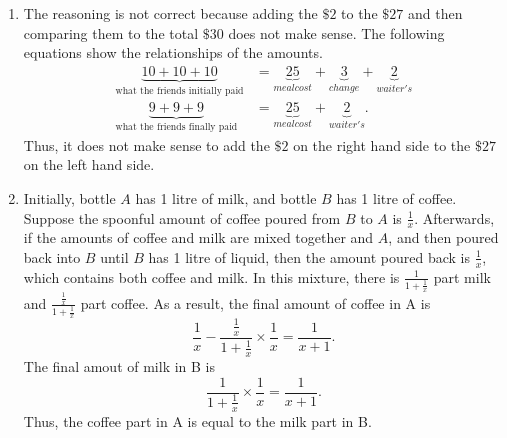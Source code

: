 \documentclass{article}
\begin{document}
\begin{enumerate}[label=(\roman*)]
\begin{enumerate}[label=(\alph*)]
\begin{proof}
\begin{align*}
                            \sqrt{100001} - \sqrt{100000} & < \frac{100001 - 100000}{2\times\sqrt{100000}}                                                      \\
                            \sqrt{100001} - \sqrt{100000} & < \frac{1}{2\times\sqrt{100000}}.
                        \end{align*}
                    \end{proof}
          \end{enumerate}
    \item The reasoning is not correct because adding the $\$2$ to the $\$27$ and then comparing
              them to the total $\$30$ does not make sense. The following equations show the
              relationships of the amounts.
              \begin{align*}
                  \underbrace{10 + 10 + 10}_{\text{what the friends initially paid}} & =
                  \underbrace{25}_{meal cost} + \underbrace{3}_{change} + \underbrace{2}_{waiter's} \\
                  \underbrace{9 + 9 + 9}_{\text{what the friends finally paid}}      & =
                  \underbrace{25}_{meal cost} + \underbrace{2}_{waiter's}.
              \end{align*}
              Thus, it does not make sense to add the $\$2$ on the right hand side to the $\$27$ on
          the left hand side.
    \item Initially, bottle $A$ has 1 litre of milk, and bottle $B$ has 1 litre of coffee. Suppose
          the spoonful amount of coffee poured from $B$ to $A$ is $\displaystyle \frac{1}{x}$.
          Afterwards, if the amounts of coffee and milk are mixed together and $A$, and then poured
          back into $B$ until $B$ has 1 litre of liquid, then the amount poured back is
          $\displaystyle \frac{1}{x}$, which contains both coffee and milk. In this mixture, there
          is $\displaystyle \frac{1}{1+\frac{1}{x}}$ part milk and
          $\displaystyle \frac{\frac{1}{x}}{1+\frac{1}{x}}$ part coffee. As a result, the final
          amount of coffee in A is
          \[
              \frac{1}{x} - \frac{\frac{1}{x}}{1+\frac{1}{x}}\times\frac{1}{x}
              = \frac{1}{x+1}.
          \]
          The final amout of milk in B is
          \[
              \frac{1}{1+\frac{1}{x}}\times\frac{1}{x}
              = \frac{1}{x+1}.
          \]
          Thus, the coffee part in A is equal to the milk part in B.
\end{enumerate}
\end{document}
